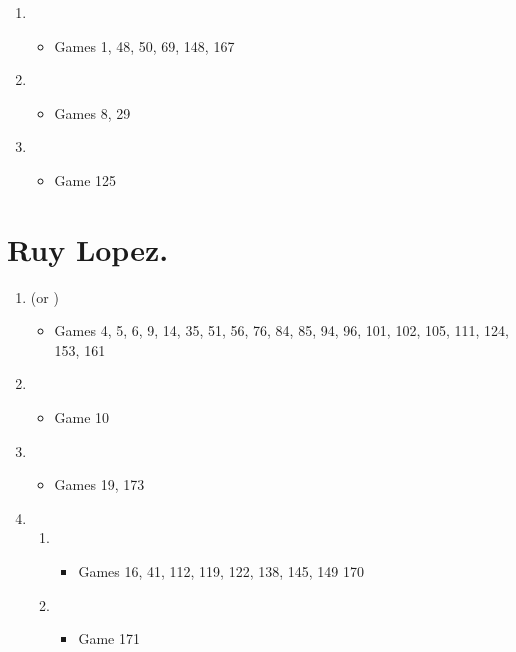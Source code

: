 \begin{multicols}{2}
\begin{enumerate}
\item \newgame{}
\begin{itemize}
\item Games 1, 48, 50, 69, 148, 167
\end{itemize}

\item \newgame{}
\begin{itemize}
\item Games 8, 29
\end{itemize}

\item \newgame{}
\begin{itemize}
\item Game 125
\end{itemize}
\end{enumerate}


\section{Ruy Lopez.} 
\newgame{}
\begin{enumerate}
\item {} (or )
\begin{itemize}
\item Games 4, 5, 6, 9, 14, 35, 51, 56, 76, 84, 85, 94, 96, 101, 102, 105, 111, 124, 153, 161
\end{itemize}
\item {}
\begin{itemize}
\item Game 10
\end{itemize}
\item {}
\begin{itemize}
\item Games 19, 173
\end{itemize}

\item {}
\begin{enumerate}
\item {}
\begin{itemize}
\item Games 16, 41, 112, 119, 122, 138, 145, 149 170
\end{itemize}

\item {}
\begin{itemize}
\item Game 171
\end{itemize}


\end{enumerate}
\end{enumerate}
\end{multicols}
